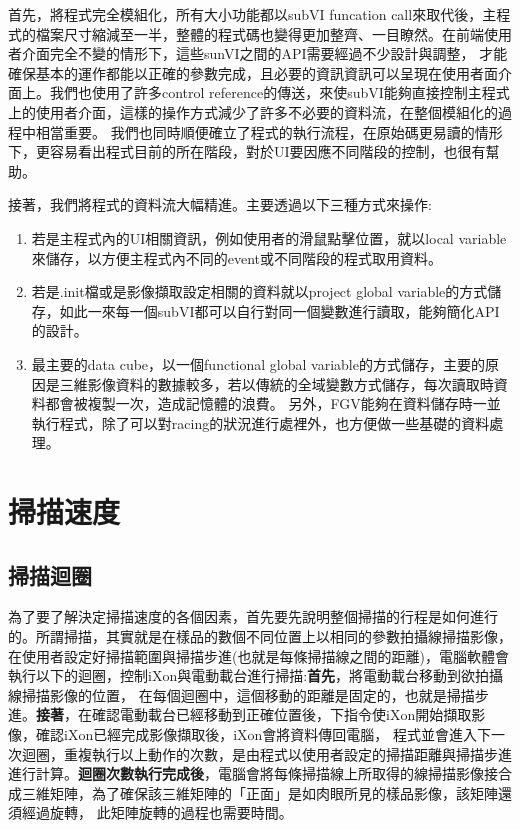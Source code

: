 \documentclass[12pt]{article}
\begin{document}
    首先，將程式完全模組化，所有大小功能都以subVI funcation call來取代後，主程式的檔案尺寸縮減至一半，整體的程式碼也變得更加整齊、一目瞭然。在前端使用者介面完全不變的情形下，這些sunVI之間的API需要經過不少設計與調整，
    才能確保基本的運作都能以正確的參數完成，且必要的資訊資訊可以呈現在使用者面介面上。我們也使用了許多control reference的傳送，來使subVI能夠直接控制主程式上的使用者介面，這樣的操作方式減少了許多不必要的資料流，在整個模組化的過程中相當重要。
    我們也同時順便確立了程式的執行流程，在原始碼更易讀的情形下，更容易看出程式目前的所在階段，對於UI要因應不同階段的控制，也很有幫助。

    接著，我們將程式的資料流大幅精進。主要透過以下三種方式來操作:
    \begin{enumerate}
        \item 若是主程式內的UI相關資訊，例如使用者的滑鼠點擊位置，就以local variable來儲存，以方便主程式內不同的event或不同階段的程式取用資料。
        \item 若是.init檔或是影像擷取設定相關的資料就以project global variable的方式儲存，如此一來每一個subVI都可以自行對同一個變數進行讀取，能夠簡化API的設計。
        \item 最主要的data cube，以一個functional global variable的方式儲存，主要的原因是三維影像資料的數據較多，若以傳統的全域變數方式儲存，每次讀取時資料都會被複製一次，造成記憶體的浪費。
        另外，FGV能夠在資料儲存時一並執行程式，除了可以對racing的狀況進行處裡外，也方便做一些基礎的資料處理。
    \end{enumerate}
    \section{掃描速度}
    \subsection{掃描迴圈}
    為了要了解決定掃描速度的各個因素，首先要先說明整個掃描的行程是如何進行的。所謂掃描，其實就是在樣品的數個不同位置上以相同的參數拍攝線掃描影像，
    在使用者設定好掃描範圍與掃描步進(也就是每條掃描線之間的距離)，電腦軟體會執行以下的迴圈，控制iXon與電動載台進行掃描:\textbf{首先}，將電動載台移動到欲拍攝線掃描影像的位置，
    在每個迴圈中，這個移動的距離是固定的，也就是掃描步進。\textbf{接著}，在確認電動載台已經移動到正確位置後，下指令使iXon開始擷取影像，確認iXon已經完成影像擷取後，iXon會將資料傳回電腦，
    程式並會進入下一次迴圈，重複執行以上動作的次數，是由程式以使用者設定的掃描距離與掃描步進進行計算。\textbf{迴圈次數執行完成後}，電腦會將每條掃描線上所取得的線掃描影像接合成三維矩陣，為了確保該三維矩陣的「正面」是如肉眼所見的樣品影像，該矩陣還須經過旋轉，
    此矩陣旋轉的過程也需要時間。
\end{document}
